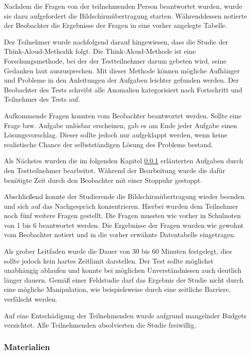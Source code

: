 Nachdem die Fragen von der teilnehmenden Person beantwortet wurden, wurde sie
dazu aufgefordert die Bildschirmübertragung starten. Währenddessen notierte der
Beobachter die Ergebnisse der Fragen in eine vorher angelegte Tabelle.

Der Teilnehmer wurde nachfolgend darauf hingewiesen, dass die Studie der
Think-Aloud-Methodik folgt. Die Think-Aloud-Methode ist eine Forschungsmethode,
bei der der Testteilnehmer darum gebeten wird, seine Gedanken laut
auszusprechen. Mit dieser Methode können mögliche Aufhänger und Probleme in den
Anleitungen der Aufgaben leichter gefunden werden. Der Beobachter des Tests
schreibt alle Anomalien kategorisiert nach Fortschritt und Teilnehmer des Tests
auf. \parencite{think-aloud}

Aufkommende Fragen konnten vom Beobachter beantwortet werden. Sollte eine Frage
bzw. Aufgabe unlösbar erscheinen, gab es am Ende jeder Aufgabe einen
Lösungsvorschlag. Dieser sollte jedoch nur aufgeklappt werden, wenn keine
realistische Chance der selbstständigen Lösung des Problems bestand.

Als Nächstes wurden die im folgenden Kapitel \ref{studie-materialien}
erläuterten Aufgaben durch den Testteilnehmer bearbeitet. Während der
Bearbeitung wurde die dafür benötigte Zeit durch den Beobachter mit einer
Stoppuhr gestoppt.

Abschließend konnte der Studierende die Bildschirmübertragung wieder beenden und
sich auf das Nachgespräch konzentrieren. Hierbei wurden dem Teilnehmer noch
fünf weitere Fragen gestellt. Die Fragen mussten wie vorher in Schulnoten von 1
bis 6 beantwortet werden. Die Ergebnisse der Fragen wurden wie gewohnt vom
Beobachter notiert und in die vorher erwähnte Datentabelle eingetragen.

Als grober Leitfaden wurde die Dauer von 30 bis 60 Minuten festgelegt, dies
sollte jedoch kein hartes Zeitlimit darstellen. Der Test sollte möglichst
unabhängig ablaufen und konnte bei möglichen Unverständnissen auch deutlich
länger dauern. Gemäß einer Feldstudie darf das Ergebnis der Studie nicht durch
eine mögliche  Manipulation, wie beispielsweise durch eine zeitliche Barriere,
verfälscht werden.

Auf eine Entschädigung der Teilnehmenden wurde aufgrund mangelnder Budgets
verzichtet. Alle Teilnehmenden absolvierten die Studie freiwillig.

\subsubsection{Materialien}\label{studie-materialien}
